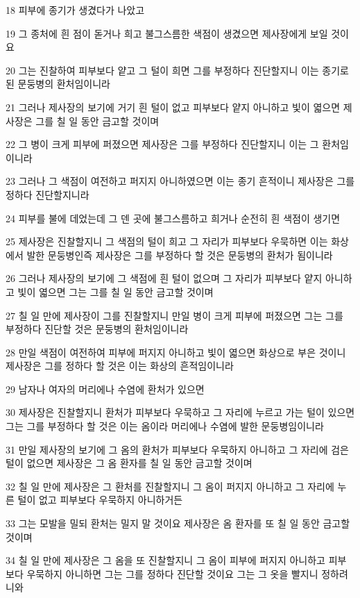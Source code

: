 \par 18 피부에 종기가 생겼다가 나았고
\par 19 그 종처에 흰 점이 돋거나 희고 불그스름한 색점이 생겼으면 제사장에게 보일 것이요
\par 20 그는 진찰하여 피부보다 얕고 그 털이 희면 그를 부정하다 진단할지니 이는 종기로 된 문둥병의 환처임이니라
\par 21 그러나 제사장의 보기에 거기 흰 털이 없고 피부보다 얕지 아니하고 빛이 엷으면 제사장은 그를 칠 일 동안 금고할 것이며
\par 22 그 병이 크게 피부에 퍼졌으면 제사장은 그를 부정하다 진단할지니 이는 그 환처임이니라
\par 23 그러나 그 색점이 여전하고 퍼지지 아니하였으면 이는 종기 흔적이니 제사장은 그를 정하다 진단할지니라
\par 24 피부를 불에 데었는데 그 덴 곳에 불그스름하고 희거나 순전히 흰 색점이 생기면
\par 25 제사장은 진찰할지니 그 색점의 털이 희고 그 자리가 피부보다 우묵하면 이는 화상에서 발한 문둥병인즉 제사장은 그를 부정하다 할 것은 문둥병의 환처가 됨이니라
\par 26 그러나 제사장의 보기에 그 색점에 흰 털이 없으며 그 자리가 피부보다 얕지 아니하고 빛이 엷으면 그는 그를 칠 일 동안 금고할 것이며
\par 27 칠 일 만에 제사장이 그를 진찰할지니 만일 병이 크게 피부에 퍼졌으면 그는 그를 부정하다 진단할 것은 문둥병의 환처임이니라
\par 28 만일 색점이 여전하여 피부에 퍼지지 아니하고 빛이 엷으면 화상으로 부은 것이니 제사장은 그를 정하다 할 것은 이는 화상의 흔적임이니라
\par 29 남자나 여자의 머리에나 수염에 환처가 있으면
\par 30 제사장은 진찰할지니 환처가 피부보다 우묵하고 그 자리에 누르고 가는 털이 있으면 그는 그를 부정하다 할 것은 이는 옴이라 머리에나 수염에 발한 문둥병임이니라
\par 31 만일 제사장의 보기에 그 옴의 환처가 피부보다 우묵하지 아니하고 그 자리에 검은 털이 없으면 제사장은 그 옴 환자를 칠 일 동안 금고할 것이며
\par 32 칠 일 만에 제사장은 그 환처를 진찰할지니 그 옴이 퍼지지 아니하고 그 자리에 누른 털이 없고 피부보다 우묵하지 아니하거든
\par 33 그는 모발을 밀되 환처는 밀지 말 것이요 제사장은 옴 환자를 또 칠 일 동안 금고할 것이며
\par 34 칠 일 만에 제사장은 그 옴을 또 진찰할지니 그 옴이 피부에 퍼지지 아니하고 피부보다 우묵하지 아니하면 그는 그를 정하다 진단할 것이요 그는 그 옷을 빨지니 정하려니와
